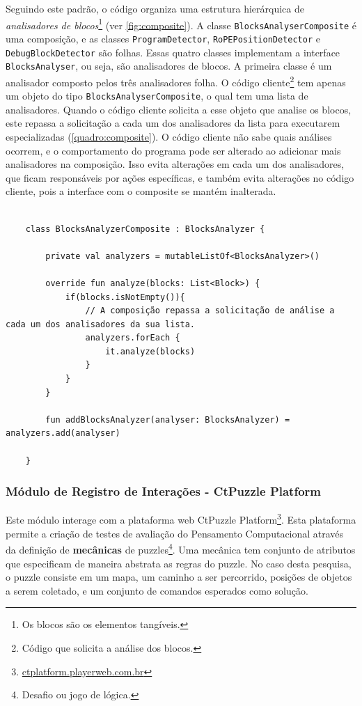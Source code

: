 Seguindo este padrão, o código organiza uma estrutura hierárquica de \textit{analisadores de blocos}\footnote{Os blocos são os elementos tangíveis.} (ver \autoref{fig:composite}). A classe \texttt{BlocksAnalyserComposite} é uma composição, e as classes \texttt{ProgramDetector}, \texttt{RoPEPositionDetector} e \texttt{DebugBlockDetector} são folhas. Essas quatro classes implementam a interface \texttt{BlocksAnalyser}, ou seja, são analisadores de blocos. A primeira classe é um analisador composto pelos três analisadores folha.
O código cliente\footnote{Código que solicita a análise dos blocos.} tem apenas um objeto do tipo \texttt{BlocksAnalyserComposite}, o qual tem uma lista de analisadores. Quando o código cliente solicita a esse objeto que analise os blocos, este repassa a solicitação a cada um dos analisadores da lista para executarem especializadas (\autoref{quadro:composite}). O código cliente não sabe quais análises ocorrem, e o comportamento do programa pode ser alterado ao adicionar mais analisadores na composição. Isso evita alterações em cada um dos analisadores, que ficam responsáveis por ações específicas, e também evita alterações no código cliente, pois a interface com o composite se mantém inalterada.

\begin{quadro}[!h]
    \begin{verbatim}
    
    class BlocksAnalyzerComposite : BlocksAnalyzer {

        private val analyzers = mutableListOf<BlocksAnalyzer>()

        override fun analyze(blocks: List<Block>) {
            if(blocks.isNotEmpty()){
                // A composição repassa a solicitação de análise a cada um dos analisadores da sua lista.
                analyzers.forEach {
                    it.analyze(blocks)
                }
            }
        }

        fun addBlocksAnalyzer(analyser: BlocksAnalyzer) = analyzers.add(analyser)
        
    }
    \end{verbatim}
    \label{quadro:composite}
\end{quadro}

\subsubsection{Módulo de Registro de Interações - CtPuzzle Platform}
Este módulo interage com a plataforma web CtPuzzle Platform\footnote{\url{ctplatform.playerweb.com.br}}. Esta plataforma permite a criação de testes de avaliação do Pensamento Computacional através da definição de \textbf{mecânicas} de puzzles\footnote{Desafio ou jogo de lógica.}. Uma mecânica tem conjunto de atributos que especificam de maneira abstrata as regras do puzzle. No caso desta pesquisa, o puzzle consiste em um mapa, um caminho a ser percorrido, posições de objetos a serem coletado, e um conjunto de comandos esperados como solução. 

